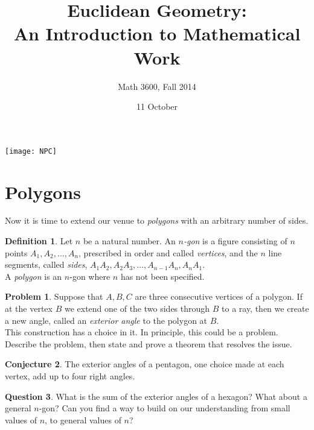 \documentclass{tufte-handout}
\title{Euclidean Geometry:\\An Introduction to Mathematical Work}
\author[]{Math 3600, Fall 2014}
\date{11 October}
\theoremstyle{definition}
\newtheorem{problem}{Problem}[section]
\newtheorem{conjecture}[problem]{Conjecture}
\newtheorem*{definition}{Definition}
\newtheorem{question}[problem]{Question}
\begin{document}
\maketitle
\begin{marginfigure}
    \texttt{[image: NPC]}
\end{marginfigure}

\setcounter{section}{5}

\section{Polygons}
Now it is time to extend our venue to \emph{polygons} with an arbitrary number of sides.

\begin{definition}\label{defn:n-gon}
Let $n$ be a natural number. An \emph{$n$-gon} is a figure consisting of $n$ points $A_1, A_2, \ldots, A_n$, prescribed in order and called \emph{vertices}, and the $n$ line segments, called \emph{sides}, $A_1A_2, A_2A_3, \ldots, A_{n-1}A_n, A_nA_1$.\\
A \emph{polygon} is an $n$-gon where $n$ has not been specified.
\end{definition}



\begin{problem}\label{prob:exterior-angle}
Suppose that $A,B,C$ are three consecutive vertices of a polygon. 
If at the vertex $B$ we extend one of the two sides through $B$ to a ray, then we create a new angle, called an \emph{exterior angle} to the polygon at $B$.\\
This construction has a choice in it. 
In principle, this could be a problem. 
Describe the problem, then state and prove a theorem that resolves the issue.
\end{problem}




\begin{conjecture}\label{conj:ext-angles-pentagon}
The exterior angles of a pentagon, one choice made at each vertex, add up to four right angles.
\end{conjecture}


\begin{question}\label{question-induction}
What is the sum of the exterior angles of a hexagon? 
What about a general $n$-gon? 
Can you find a way to build on our understanding from small values of $n$, to general values of $n$?
\end{question}



\vfill
\end{document}
